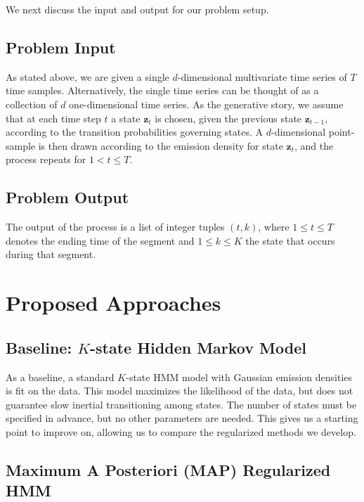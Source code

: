 \documentclass[12pt]{article}
\begin{document}
We next discuss the input and output for our problem setup.

\subsection{Problem Input}

As stated above, we are given a single $d$-dimensional multivariate time series of $T$ time samples. Alternatively, the single time series can be thought of as a collection of $d$ one-dimensional time series. As the generative story, we assume that at each time step $t$ a state $\mathbf{z}_t$ is chosen, given the previous state $\mathbf{z}_{t-1}$, according to the transition probabilities governing states. A $d$-dimensional point-sample is then drawn according to the emission density for state $\mathbf{z}_t$, and the process repeats for $1 < t \leq T$.

\subsection{Problem Output}

The output of the process is a list of integer tuples $(t, k)$, where $1 \leq t \leq T$ denotes the ending time of the segment and $1 \leq k \leq K$ the state that occurs during that segment. 

\section{Proposed Approaches}

\subsection{Baseline: $K$-state Hidden Markov Model}

As a baseline, a standard $K$-state HMM model with Gaussian emission densities is fit on the data. This model maximizes the likelihood of the data, but does not guarantee slow inertial transitioning among states. The number of states must be specified in advance, but no other parameters are needed. This gives us a starting point to improve on, allowing us to compare the regularized methods we develop.

\subsection{Maximum A Posteriori (MAP) Regularized HMM}
\end{document}
